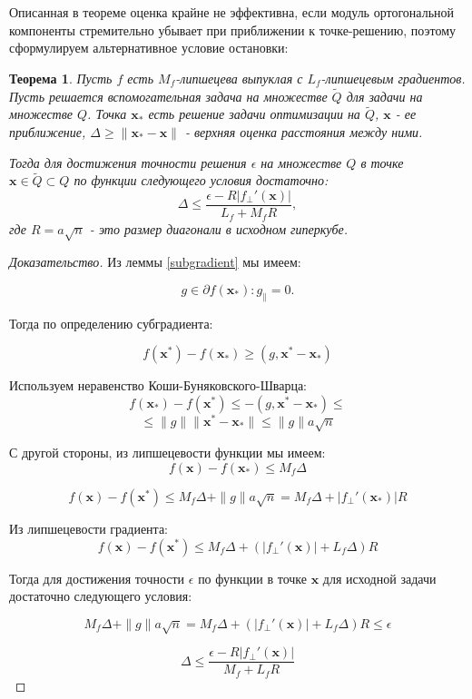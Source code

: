 \documentclass[12pt]{article}
\newtheorem{theorem}{Теорема}[section]
\begin{document}
Описанная в теореме оценка крайне не эффективна, если модуль ортогональной компоненты стремительно убывает при приближении к точке-решению, поэтому сформулируем альтернативное условие остановки:

\begin{theorem}
\label{small}
Пусть $f$ есть $M_f$-липшецева выпуклая с $L_f$-липшецевым градиентов. Пусть решается вспомогательная задача на множестве $\tilde{Q}$ для задачи на множестве $Q$. Точка $\textbf{x}_*$ есть решение задачи оптимизации на $\tilde{Q}$, $\textbf{x}$ - ее приближение, $\Delta \geq \|\textbf{x}_*-\textbf{x}\|$ - верхняя оценка расстояния между ними.

Тогда для достижения точности решения $\epsilon$ на множестве $Q$ в точке $\textbf{x}\in \tilde{Q}\subset Q$ по функции следующего условия достаточно:
$$\Delta \leq \frac{\epsilon- R|f_\perp'(\textbf{x})|}{L_f+M_f R}, $$
где $R=a\sqrt{n}$ - это размер диагонали в исходном гиперкубе.
\end{theorem}

\begin{proof}[Доказательство]

Из леммы \ref{subgradient} мы имеем:

$$g \in \partial f(\textbf{x}_*): g_\parallel = 0.$$

Тогда по определению субградиента:

$$f(\textbf{x}^*) - f(\textbf{x}_*) \geq (g, \textbf{x}^* - \textbf{x}_*)$$

Используем неравенство Коши-Буняковского-Шварца:
$$f(\textbf{x}_*) - f(\textbf{x}^*) \leq -(g, \textbf{x}^* - \textbf{x}_* )\leq$$
$$\leq \|g\| \|\textbf{x}^* - \textbf{x}_*\|\leq \|g\|a\sqrt{n}$$

С другой стороны, из липшецевости функции мы имеем:
$$f(\textbf{x})-f(\textbf{x}_*)\leq M_f \Delta$$

$$f(\textbf{x})-f(\textbf{x}^*) \leq M_f \Delta +\|g\|a\sqrt{n} = M_f \Delta + |f_\perp'(\textbf{x}_*)|R$$

Из липшецевости градиента:
$$f(\textbf{x})-f(\textbf{x}^*) \leq M_f\Delta + \left(|f_\perp'(\textbf{x})|+L_f\Delta\right)R$$

Тогда для достижения точности $\epsilon$ по функции в точке $\textbf{x}$ для исходной задачи достаточно следующего условия:

$$M_f\Delta +\|g\|a\sqrt{n} = M_f\Delta + \left(|f_\perp'(\textbf{x})|+L_f\Delta\right)R \leq \epsilon$$

$$\Delta \leq \frac{\epsilon - R |f_\perp'(\textbf{x})|}{M_f+L_f R}$$
\end{proof}
\end{document}

